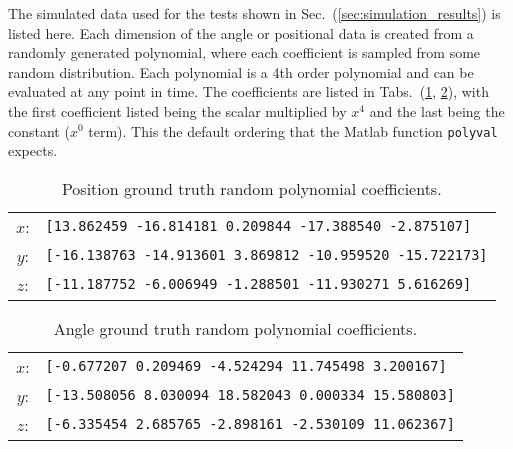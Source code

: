 The simulated data used for the tests shown in Sec.~(\ref{sec:simulation_results}) is listed here.  Each dimension of the angle or positional data is created from a randomly generated polynomial, where each coefficient is sampled from some random distribution.  Each polynomial is a 4th order polynomial and can be evaluated at any point in time.  The coefficients are listed in Tabs.~(\ref{tab:pos_coef}, \ref{tab:ang_coef}), with the first coefficient listed being the scalar multiplied by $x^4$ and the last being the constant ($x^0$ term).  This the default ordering that the Matlab function \texttt{polyval} expects. 

\begin{table}[h]
    \centering
    \caption{Position ground truth random polynomial coefficients.}
    \begin{tabular}{cl}
        $x$: & \texttt{[13.862459 -16.814181 0.209844 -17.388540 -2.875107]} \\
        $y$: & \texttt{[-16.138763 -14.913601 3.869812 -10.959520 -15.722173]}\\
        $z$: & \texttt{[-11.187752 -6.006949 -1.288501 -11.930271 5.616269]}
    \end{tabular}
    \label{tab:pos_coef}
\end{table}

\begin{table}[h]
    \centering
    \caption{Angle ground truth random polynomial coefficients.}
    \begin{tabular}{cl}
        $x$: & \texttt{[-0.677207 0.209469 -4.524294 11.745498 3.200167]} \\
        $y$: & \texttt{[-13.508056 8.030094 18.582043 0.000334 15.580803]}\\
        $z$: & \texttt{[-6.335454 2.685765 -2.898161 -2.530109 11.062367]}
    \end{tabular}
    \label{tab:ang_coef}
\end{table}